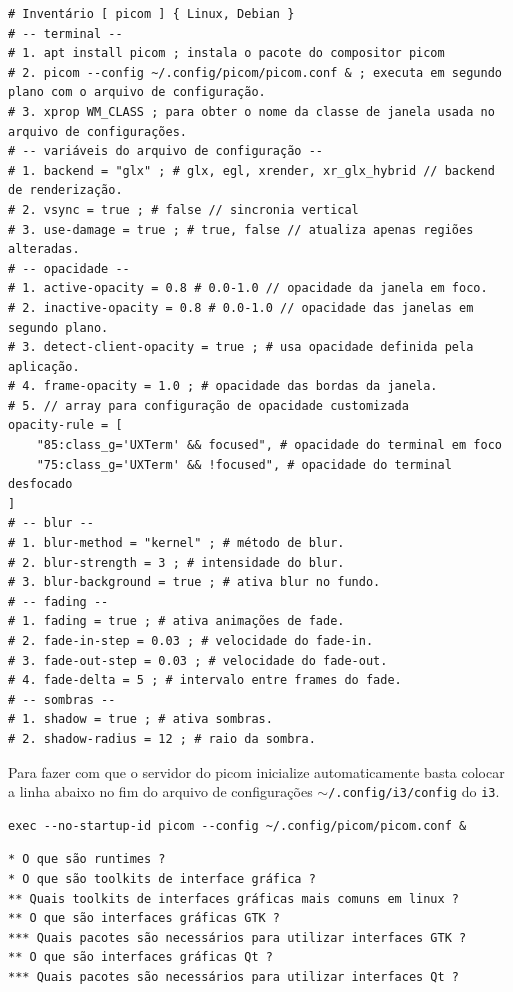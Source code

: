 \documentclass[12pt,a4paper]{article}
\begin{document}
\begin{lstlisting}
# Inventário [ picom ] { Linux, Debian }
# -- terminal -- 
# 1. apt install picom ; instala o pacote do compositor picom 
# 2. picom --config ~/.config/picom/picom.conf & ; executa em segundo plano com o arquivo de configuração.
# 3. xprop WM_CLASS ; para obter o nome da classe de janela usada no arquivo de configurações.
# -- variáveis do arquivo de configuração -- 
# 1. backend = "glx" ; # glx, egl, xrender, xr_glx_hybrid // backend de renderização.
# 2. vsync = true ; # false // sincronia vertical 
# 3. use-damage = true ; # true, false // atualiza apenas regiões alteradas.
# -- opacidade --
# 1. active-opacity = 0.8 # 0.0-1.0 // opacidade da janela em foco.
# 2. inactive-opacity = 0.8 # 0.0-1.0 // opacidade das janelas em segundo plano.
# 3. detect-client-opacity = true ; # usa opacidade definida pela aplicação.
# 4. frame-opacity = 1.0 ; # opacidade das bordas da janela.
# 5. // array para configuração de opacidade customizada
opacity-rule = [
	"85:class_g='UXTerm' && focused", # opacidade do terminal em foco 
    "75:class_g='UXTerm' && !focused", # opacidade do terminal desfocado
] 
# -- blur --
# 1. blur-method = "kernel" ; # método de blur.
# 2. blur-strength = 3 ; # intensidade do blur.
# 3. blur-background = true ; # ativa blur no fundo.
# -- fading -- 
# 1. fading = true ; # ativa animações de fade.
# 2. fade-in-step = 0.03 ; # velocidade do fade-in.
# 3. fade-out-step = 0.03 ; # velocidade do fade-out.
# 4. fade-delta = 5 ; # intervalo entre frames do fade.
# -- sombras -- 
# 1. shadow = true ; # ativa sombras.
# 2. shadow-radius = 12 ; # raio da sombra.
\end{lstlisting}

\vspace{\baselineskip}

Para fazer com que o servidor do picom inicialize automaticamente basta colocar a linha abaixo no fim do arquivo de configurações \texttt{$\sim$/.config/i3/config} do \texttt{i3}.\\

\begin{lstlisting}
exec --no-startup-id picom --config ~/.config/picom/picom.conf & 
\end{lstlisting}

\vspace{\baselineskip}

\begin{lstlisting}
* O que são runtimes ? 
* O que são toolkits de interface gráfica ?
** Quais toolkits de interfaces gráficas mais comuns em linux ? 
** O que são interfaces gráficas GTK ?
*** Quais pacotes são necessários para utilizar interfaces GTK ?
** O que são interfaces gráficas Qt ? 
*** Quais pacotes são necessários para utilizar interfaces Qt ? 
\end{lstlisting}
\end{document}
